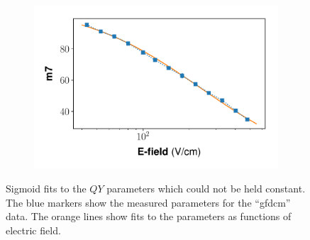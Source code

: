 \begin{figure}[h!]
\begin{subfigure}{0.45\textwidth}
  \caption{}
\end{subfigure}%
\begin{subfigure}{0.45\textwidth}
  \centering
  \includegraphics[width=\textwidth]{Figures/Yields_fit_old/NEST_m7_fit_old.pdf}
  \caption{}
\end{subfigure}
\caption{Sigmoid fits to the $QY$ parameters which could not be held constant. The blue markers show the measured parameters for the ``gfdcm'' data. The orange lines show fits to the parameters as functions of electric field.}
\label{fig:gfdcm_prelim_params}
\end{figure}

